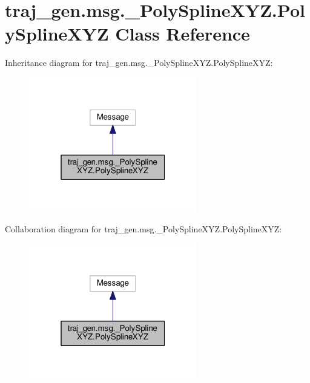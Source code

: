\hypertarget{classtraj__gen_1_1msg_1_1___poly_spline_x_y_z_1_1_poly_spline_x_y_z}{}\section{traj\+\_\+gen.\+msg.\+\_\+\+Poly\+Spline\+X\+Y\+Z.\+Poly\+Spline\+X\+YZ Class Reference}
\label{classtraj__gen_1_1msg_1_1___poly_spline_x_y_z_1_1_poly_spline_x_y_z}


Inheritance diagram for traj\+\_\+gen.\+msg.\+\_\+\+Poly\+Spline\+X\+Y\+Z.\+Poly\+Spline\+X\+YZ\+:
\nopagebreak
\begin{figure}[H]
\begin{center}
\leavevmode
\includegraphics[width=208pt]{classtraj__gen_1_1msg_1_1___poly_spline_x_y_z_1_1_poly_spline_x_y_z__inherit__graph}
\end{center}
\end{figure}


Collaboration diagram for traj\+\_\+gen.\+msg.\+\_\+\+Poly\+Spline\+X\+Y\+Z.\+Poly\+Spline\+X\+YZ\+:
\nopagebreak
\begin{figure}[H]
\begin{center}
\leavevmode
\includegraphics[width=208pt]{classtraj__gen_1_1msg_1_1___poly_spline_x_y_z_1_1_poly_spline_x_y_z__coll__graph}
\end{center}
\end{figure}
